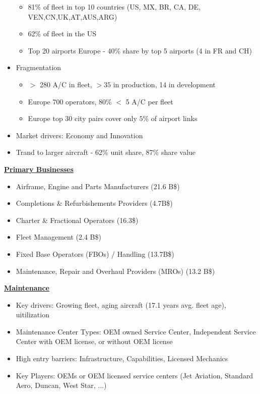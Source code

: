 \documentclass[9pt, landscape, fleqn]{scrartcl}
\begin{document}
\begin{multicols*}{3}
\begin{itemize}
\begin{itemize}
        \item 81\% of fleet in top 10 countries (US, MX, BR, CA, DE, VEN,CN,UK,AT,AUS,ARG)
        \item 62\% of fleet in the US 
        \item Top 20 airports Europe - 40\% share by top 5 airports (4 in FR and CH)
    \end{itemize}
    \item Fragmentation
    \begin{itemize}
        \item $>$ 280 A/C in fleet, $>35$ in production, 14 in development 
        \item Europe 700 operators, 80\% $<$ 5 A/C per fleet 
        \item Europe top 30 city pairs cover only $5\%$ of airport links 
    \end{itemize}
    \item Market drivers: Economy and Innovation 
    \item Trand to larger aircraft - 62\% unit share, 87\% share value
\end{itemize}
\underline{\textbf{Primary Businesses}}
\begin{itemize}
    \item Airframe, Engine and Parts Manufacturers (21.6 B\$)
    \item Completions \& Refurbishements Providers (4.7B\$)
    \item Charter \& Fractional Operators (16.3\$)
    \item Fleet Management (2.4 B\$)
    \item Fixed Base Operators (FBOs) / Handling (13.7B\$) 
    \item Maintenance, Repair and Overhaul Providers (MROs) (13.2 B\$)
\end{itemize}
\underline{\textbf{Maintenance}}
\begin{itemize}
    \item Key drivers: Growing fleet, aging aircraft (17.1 years avg. fleet age), uitilization
    \item Maintenance Center Types: OEM owned Service Center, Independent Service Center with OEM license, or without OEM license 
    \item High entry barriers: Infrastructure, Capabilities, Licensed Mechanics 
    \item Key Players: OEMs or OEM licensed service centers (Jet Aviation, Standard Aero, Duncan, West Star, ...)
\end{itemize}

\end{multicols*}
\end{document}

